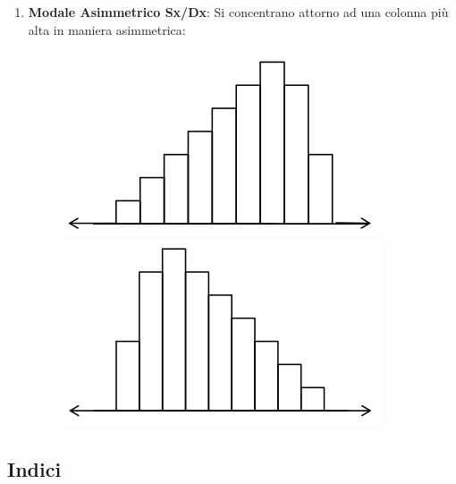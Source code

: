 \documentclass{article}
\begin{document}
\begin{enumerate}
    \begin{enumerate}
        \item \textbf{Modale Asimmetrico Sx/Dx}: Si concentrano attorno ad una colonna più alta in maniera asimmetrica:
        \begin{figure}[H]
  \centering
  \begin{minipage}[b]{0.4\textwidth}
    \includegraphics[width=\textwidth]{img/asimmetrico_sx.png}
  \end{minipage}
  \hspace{10px}
  \begin{minipage}[b]{0.4\textwidth}
    \includegraphics[width=\textwidth]{img/asimmetrico_dx.png}
  \end{minipage}
\end{figure}
    \end{enumerate}
\end{enumerate}

\newpage

\subsection{Indici}
\end{document}
